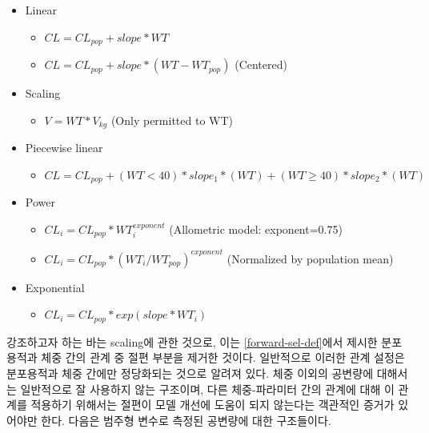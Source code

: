 \documentclass[
  11pt,
  krantz2, a4paper, twoside]{krantz}
\providecommand{\tightlist}{%
  \setlength{\itemsep}{0pt}\setlength{\parskip}{0pt}}
\theoremstyle{definition}
\theoremstyle{definition}
\theoremstyle{definition}
\theoremstyle{remark}
\begin{document}
\begin{itemize}
\tightlist
\item
  Linear

  \begin{itemize}
  \tightlist
  \item
    \(CL = CL_{pop} + slope * WT\)
  \item
    \(CL = CL_{pop} + slope * (WT-WT_{pop})\) \hfill (Centered)
  \end{itemize}
\item
  Scaling

  \begin{itemize}
  \tightlist
  \item
    \(V = WT * V_{kg}\) \hfill (Only permitted to WT)
  \end{itemize}
\item
  Piecewise linear

  \begin{itemize}
  \tightlist
  \item
    \(CL = CL_{pop} + (WT<40)*slope_1*(WT) + (WT\geq40)*slope_2*(WT)\)
  \end{itemize}
\item
  Power

  \begin{itemize}
  \tightlist
  \item
    \(CL_i = CL_{pop} * WT_i^{exponent}\) \hfill (Allometric model: exponent=0.75)
  \item
    \(CL_i = CL_{pop} * (WT_i/WT_{pop})^{exponent}\) \hfill (Normalized by population mean)
  \end{itemize}
\item
  Exponential

  \begin{itemize}
  \tightlist
  \item
    \(CL_i = CL_{pop} * exp(slope*WT_i)\)
  \end{itemize}
\end{itemize}

강조하고자 하는 바는 scaling에 관한 것으로, 이는 \ref{forward-sel-def}에서 제시한 분포용적과 체중 간의 관계 중 절편 부분을 제거한 것이다. 일반적으로 이러한 관계 설정은 분포용적과 체중 간에만 정당화되는 것으로 알려져 있다. 체중 이외의 공변량에 대해서는 일반적으로 잘 사용하지 않는 구조이며, 다른 체중-파라미터 간의 관계에 대해 이 관계를 적용하기 위해서는 절편이 모델 개선에 도움이 되지 않는다는 객관적인 증거가 있어야만 한다. 다음은 범주형 변수로 측정된 공변량에 대한 구조들이다.
\end{document}
